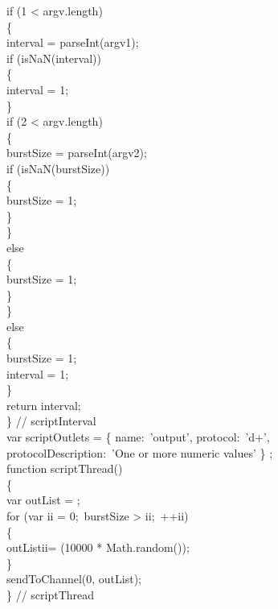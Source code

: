 \tS{}if (1 < argv.length)\\
\tS\{\\
\tS\tS{}interval = parseInt(argv\openSq{}1\closeSq);\\
\tS\tS{}if (isNaN(interval))\\
\tS\tS\{\\
\tS\tS\tS{}interval = 1;\\
\tS\tS\}\\
\tS\tS{}if (2 < argv.length)\\
\tS\tS\{\\
\tS\tS\tS{}burstSize = parseInt(argv\openSq{}2\closeSq);\\
\tS\tS\tS{}if (isNaN(burstSize))\\
\tS\tS\tS\{\\
\tS\tS\tS\tS{}burstSize = 1;\\
\tS\tS\tS\}\\
\tS\tS\}\\
\tS\tS{}else\\
\tS\tS\{\\
\tS\tS\tS{}burstSize = 1;\\
\tS\tS\}\\
\tS\}\\
\tS{}else\\
\tS\{\\
\tS\tS{}burstSize = 1;\\
\tS\tS{}interval = 1;\\
\tS\}\\
\tS{}return interval;\\
\} // scriptInterval\\

var scriptOutlets = \openSq{} \{ name:\ 'output', protocol:\ 'd+',\\
\tS\tS\tS\tS\tS\tS\tS\tS\tS\tS{}protocolDescription:\ 'One or more numeric values' \}
\closeSq;\\
\newpage
function scriptThread()\\
\{\\
\tS{}var outList = \openSq\closeSq;\\
    
\tS{}for (var ii = 0;\ burstSize > ii;\ ++ii)\\
\tS\{\\
\tS\tS{}outList\openSq{}ii\closeSq = (10000 * Math.random());\\
\tS\}\\
\tS{}sendToChannel(0, outList);\\
\} // scriptThread
\codeEnd{}
\secondaryEnd{}
\appendixEnd{}

